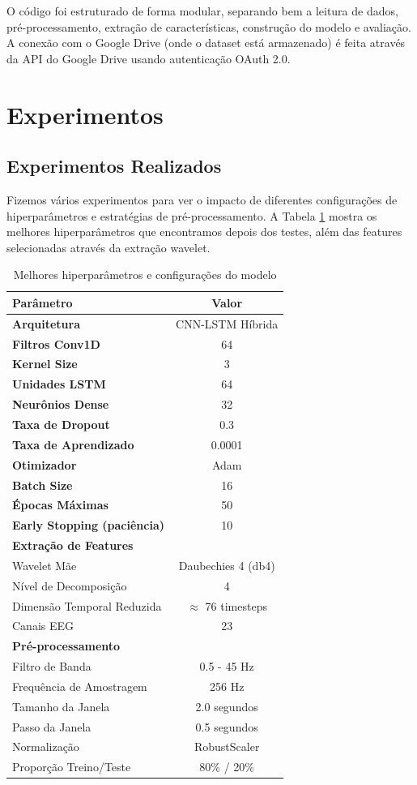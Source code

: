 \documentclass[12pt,a4paper]{article}
\begin{document}
O código foi estruturado de forma modular, separando bem a leitura de dados, pré-processamento, extração de características, construção do modelo e avaliação. A conexão com o Google Drive (onde o dataset está armazenado) é feita através da API do Google Drive usando autenticação OAuth 2.0.

\section{Experimentos}

\subsection{Experimentos Realizados}

Fizemos vários experimentos para ver o impacto de diferentes configurações de hiperparâmetros e estratégias de pré-processamento. A Tabela \ref{tab:hiperparametros} mostra os melhores hiperparâmetros que encontramos depois dos testes, além das features selecionadas através da extração wavelet.

\begin{table}[H]
\centering
\caption{Melhores hiperparâmetros e configurações do modelo}
\label{tab:hiperparametros}
\begin{tabular}{@{}lc@{}}
\toprule
\textbf{Parâmetro} & \textbf{Valor} \\
\midrule
\textbf{Arquitetura} & CNN-LSTM Híbrida \\
\textbf{Filtros Conv1D} & 64 \\
\textbf{Kernel Size} & 3 \\
\textbf{Unidades LSTM} & 64 \\
\textbf{Neurônios Dense} & 32 \\
\textbf{Taxa de Dropout} & 0.3 \\
\textbf{Taxa de Aprendizado} & 0.0001 \\
\textbf{Otimizador} & Adam \\
\textbf{Batch Size} & 16 \\
\textbf{Épocas Máximas} & 50 \\
\textbf{Early Stopping (paciência)} & 10 \\
\midrule
\textbf{Extração de Features} & \\
Wavelet Mãe & Daubechies 4 (db4) \\
Nível de Decomposição & 4 \\
Dimensão Temporal Reduzida & $\approx$ 76 timesteps \\
Canais EEG & 23 \\
\midrule
\textbf{Pré-processamento} & \\
Filtro de Banda & 0.5 - 45 Hz \\
Frequência de Amostragem & 256 Hz \\
Tamanho da Janela & 2.0 segundos \\
Passo da Janela & 0.5 segundos \\
Normalização & RobustScaler \\
Proporção Treino/Teste & 80\% / 20\% \\
\bottomrule
\end{tabular}
\end{table}
\end{document}
